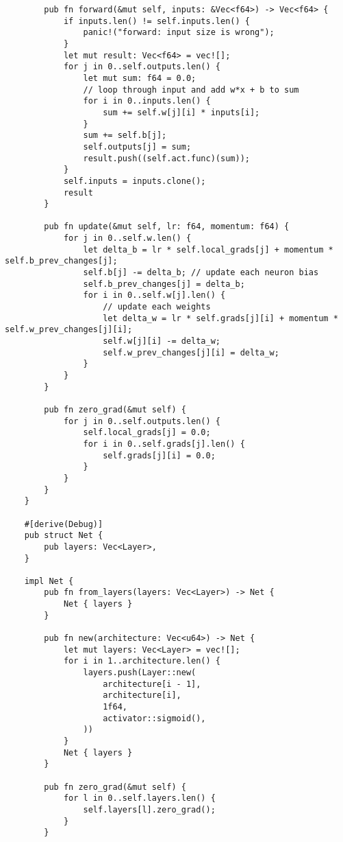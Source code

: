 \begin{verbatim}
        pub fn forward(&mut self, inputs: &Vec<f64>) -> Vec<f64> {
            if inputs.len() != self.inputs.len() {
                panic!("forward: input size is wrong");
            }
            let mut result: Vec<f64> = vec![];
            for j in 0..self.outputs.len() {
                let mut sum: f64 = 0.0;
                // loop through input and add w*x + b to sum
                for i in 0..inputs.len() {
                    sum += self.w[j][i] * inputs[i];
                }
                sum += self.b[j];
                self.outputs[j] = sum;
                result.push((self.act.func)(sum));
            }
            self.inputs = inputs.clone();
            result
        }
    
        pub fn update(&mut self, lr: f64, momentum: f64) {
            for j in 0..self.w.len() {
                let delta_b = lr * self.local_grads[j] + momentum * self.b_prev_changes[j];
                self.b[j] -= delta_b; // update each neuron bias
                self.b_prev_changes[j] = delta_b;
                for i in 0..self.w[j].len() {
                    // update each weights
                    let delta_w = lr * self.grads[j][i] + momentum * self.w_prev_changes[j][i];
                    self.w[j][i] -= delta_w;
                    self.w_prev_changes[j][i] = delta_w;
                }
            }
        }
    
        pub fn zero_grad(&mut self) {
            for j in 0..self.outputs.len() {
                self.local_grads[j] = 0.0;
                for i in 0..self.grads[j].len() {
                    self.grads[j][i] = 0.0;
                }
            }
        }
    }
    
    #[derive(Debug)]
    pub struct Net {
        pub layers: Vec<Layer>,
    }
    
    impl Net {
        pub fn from_layers(layers: Vec<Layer>) -> Net {
            Net { layers }
        }
    
        pub fn new(architecture: Vec<u64>) -> Net {
            let mut layers: Vec<Layer> = vec![];
            for i in 1..architecture.len() {
                layers.push(Layer::new(
                    architecture[i - 1],
                    architecture[i],
                    1f64,
                    activator::sigmoid(),
                ))
            }
            Net { layers }
        }
    
        pub fn zero_grad(&mut self) {
            for l in 0..self.layers.len() {
                self.layers[l].zero_grad();
            }
        }
    

\end{verbatim}
